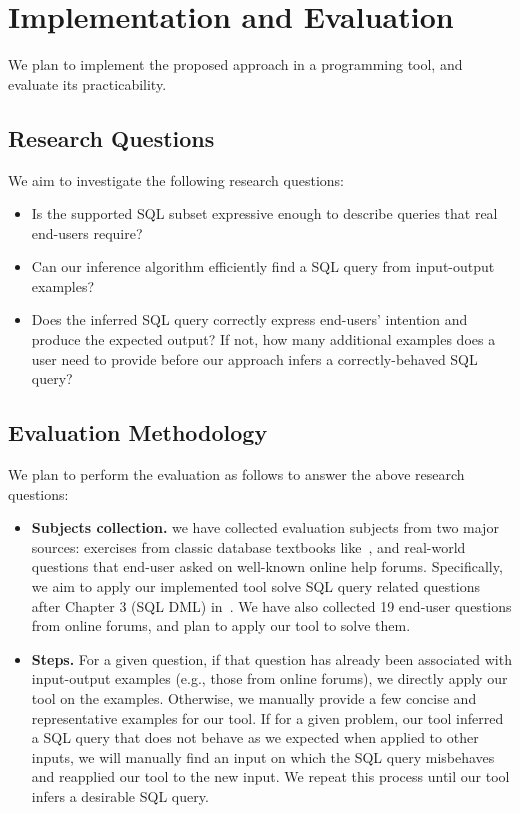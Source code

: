 
\section{Implementation and Evaluation}
\label{sec:evaluation}

We plan to implement the proposed approach in a programming
tool, and evaluate its practicability.

\subsection{Research Questions}

We aim to investigate the following research questions:

\begin{itemize}
\item Is the supported SQL subset expressive enough to describe
queries that real end-users require?

\item Can our inference algorithm efficiently find a SQL query
from input-output examples?

\item Does the inferred SQL query correctly express end-users'
intention and produce the expected output? If not, how many
additional examples does a user need to provide before our
approach infers a correctly-behaved SQL query?

\end{itemize}

\subsection{Evaluation Methodology}

We plan to perform the evaluation as follows to answer the
above research questions:

\begin{itemize}
\item \textbf{Subjects collection.} we have collected evaluation
subjects from two major sources: exercises from classic
database textbooks like~\cite{cowbook}, and real-world questions
that end-user asked on well-known online help forums. Specifically,
we aim to apply our implemented tool solve SQL query related questions
after Chapter 3 (SQL DML) in~\cite{cowbook}. We have also collected
19 end-user questions from online forums, and plan to apply our
tool to solve them.

\item{\textbf{Steps.}} For a given question, if that question
has already been associated with input-output examples (e.g.,
those from online forums), we directly apply our tool on the examples.
Otherwise, we manually provide a few concise and representative
examples for our tool.
If for a given problem, our tool inferred
a SQL query that does not behave as we expected when applied
to other inputs, we will manually find an input on which the
SQL query misbehaves and reapplied our tool to the new input. We
repeat this process until our tool infers a desirable SQL query.
\end{itemize}

